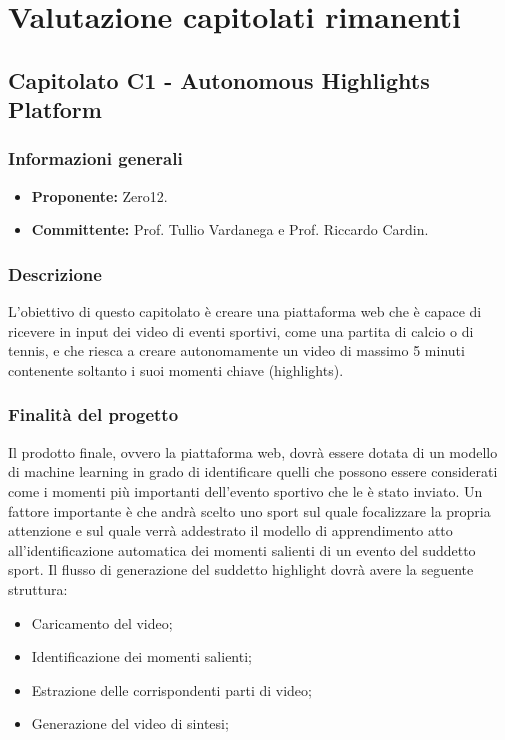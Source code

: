 

\section{Valutazione capitolati rimanenti}
    \subsection{Capitolato C1 - Autonomous Highlights Platform}
       \subsubsection{Informazioni generali}
       \begin{itemize}
           \item \textbf{Proponente: }Zero12.
           \item \textbf{Committente: }Prof. Tullio Vardanega e Prof. Riccardo Cardin.
       \end{itemize}

    \subsubsection{Descrizione}
        L'obiettivo di questo capitolato è creare una piattaforma web che è capace di ricevere in input dei video di eventi sportivi, come una partita di calcio o di tennis, e che riesca a creare autonomamente un video di massimo 5 minuti contenente soltanto i suoi momenti chiave (highlights). 
    
    \subsubsection{Finalità del progetto}
        Il prodotto finale, ovvero la piattaforma web, dovrà essere dotata di un modello di machine learning in grado di identificare quelli che possono essere considerati come i momenti più importanti dell'evento sportivo che le è stato inviato. Un fattore importante è che andrà scelto uno sport sul quale focalizzare la propria attenzione e sul quale verrà addestrato il modello di apprendimento atto all'identificazione automatica dei momenti salienti di un evento del suddetto sport.  
        Il flusso di generazione del suddetto highlight dovrà avere la seguente struttura:
        \begin{itemize}
            \item Caricamento del video; 
            \item Identificazione dei momenti salienti;
            \item Estrazione delle corrispondenti parti di video;
            \item Generazione del video di sintesi;
        \end{itemize}
